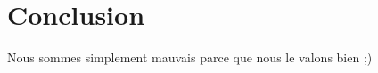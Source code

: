 \documentclass[a4paper,11pt]{report}
\begin{document}
    \setcounter{tocdepth}{1} %
    \renewcommand{\contentsname}{Sommaire} %
    \tableofcontents{} %
    \clearpage



    
    \clearpage

    
    \clearpage

    
    \clearpage

    
    \clearpage

    \chapter{Conclusion}
Nous sommes simplement mauvais parce que nous le valons bien ;)

    
\end{document}
